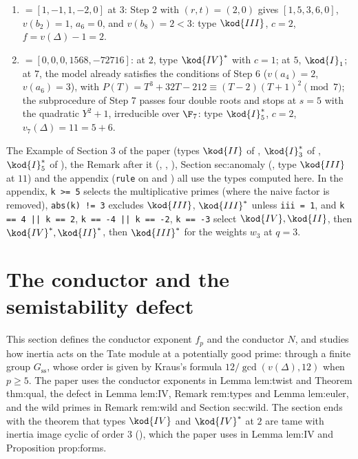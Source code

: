 \begin{example}
\begin{enumerate}[label=(\alph*)]
5 are passed ($v(a_6)=2$, $b_8=0$, $v(b_6)=4$). Step 6 with $(s,t)=(1,2)$: for a change $(1,0,s,t)$ of a model with
$a_1=a_3=0$ the formulas of  reduce to $a_1'=2s$, $a_2'=a_2-s^2$, $a_3'=2t$, $a_4'=a_4-2st$, $a_6'=a_6-t^2$, which
here give $[2,0,4,0,0]$, that is $y^2+2xy+4y=x^3$. Now $2\mid a_1,a_2$, $4\mid a_3,a_4$, $8\mid a_6$, and $P(T)=T^3$, a triple
root; Step 8: $Y^2+a_{3,2}Y-a_{6,4}=Y^2+Y$ has the distinct roots $0,1\in\F_2$. Type $\kod{IV}^*$, $c=3$, $f=8+1-7=2$.
\item {} $=[1,-1,1,-2,0]$ at $3$: Step 2 with $(r,t)=(2,0)$ gives $[1,5,3,6,0]$, $v(b_2)=1$, $a_6=0$, and
$v(b_8)=2<3$: type $\kod{III}$, $c=2$, $f=v(\Delta)-1=2$.
\item {} $=[0,0,0,1568,-72716]$: at $2$, type $\kod{IV}^*$ with $c=1$; at $5$, $\kod{I}_1$; at $7$, the model
already satisfies the conditions of Step 6 ($v(a_4)=2$, $v(a_6)=3$), with $P(T)=T^3+32T-212\equiv(T-2)(T+1)^2\pmod7$; the
subprocedure of Step 7 passes four double roots and stops at $s=5$ with the quadratic $Y^2+1$, irreducible over $\F_7$:
type $\kod{I}_5^*$, $c=2$, $v_7(\Delta)=11=5+6$.
\end{enumerate}
\end{example}

\begin{paperlink}
The Example of Section 3 of the paper (types $\kod{II}$ of , $\kod{I}_3^*$ of , $\kod{I}_5^*$ of
), the Remark after it (, , ), Section sec:anomaly (, type
$\kod{III}$ at $11$) and the appendix (\texttt{rule} on  and ) all use the types computed here. In the
appendix, \texttt{k >= 5} selects the multiplicative primes (where the naive factor is removed), \texttt{abs(k) != 3}
excludes $\kod{III}$, $\kod{III}^*$ unless \texttt{iii = 1}, and \texttt{k == 4 || k == 2}, \texttt{k == -4 || k == -2},
\texttt{k == -3} select $\kod{IV},\kod{II}$, then $\kod{IV}^*,\kod{II}^*$, then $\kod{III}^*$ for the weights $w_3$ at $q=3$.
\end{paperlink}

\section{The conductor and the semistability defect}\label{sec:reduction:conductor}

This section defines the conductor exponent $f_p$ and the conductor $N$, and studies how inertia acts on the Tate
module at a potentially good prime: through a finite group $G_{\mathrm{ss}}$, whose order is given by Kraus's formula
$12/\gcd(v(\Delta),12)$ when $p\ge5$. The paper uses the conductor exponents in Lemma lem:twist and Theorem thm:qual,
the defect in Lemma lem:IV, Remark rem:types and Lemma lem:euler, and the wild primes in Remark rem:wild and
Section sec:wild. The section ends with the theorem that types $\kod{IV}$ and $\kod{IV}^*$ at $2$ are tame with inertia
image cyclic of order $3$ (), which the paper uses in Lemma lem:IV and Proposition prop:forms.

